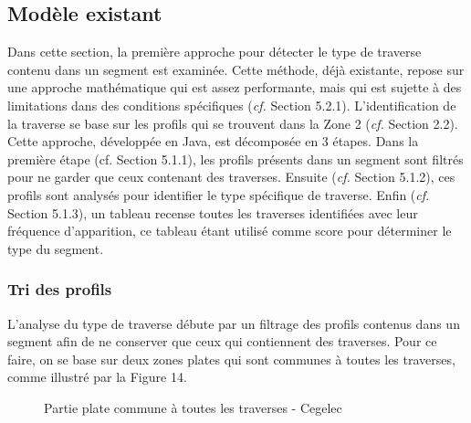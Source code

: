 \subsection{Modèle existant} 
Dans cette section, la première approche pour détecter le type de traverse contenu dans un segment est examinée. Cette méthode, déjà existante, repose sur une approche mathématique qui est assez performante, mais qui est sujette à des limitations dans des conditions spécifiques (\textit{cf.} Section 5.2.1). L'identification de la traverse se base sur les profils qui se trouvent dans la Zone 2 (\textit{cf.} Section 2.2). \\

\noindent Cette approche, développée en Java, est décomposée en 3 étapes. Dans la première étape (cf. Section 5.1.1), les profils présents dans un segment sont filtrés pour ne garder que ceux contenant des traverses. Ensuite (\textit{cf.} Section 5.1.2), ces profils sont analysés pour identifier le type spécifique de traverse. Enfin (\textit{cf.} Section 5.1.3), un tableau recense toutes les traverses identifiées avec leur fréquence d'apparition, ce tableau étant utilisé comme score pour déterminer le type du segment.


\subsubsection{Tri des profils}


L'analyse du type de traverse débute par un filtrage des profils contenus dans un segment afin de ne conserver que ceux qui contiennent des traverses. Pour ce faire, on se base sur deux zones plates qui sont communes à toutes les traverses, comme illustré par la Figure 14.  

\begin{figure}[H]
            \centering

            \caption{Partie plate commune à toutes les traverses - Cegelec \cite{RHEA}} 
        \end{figure}

